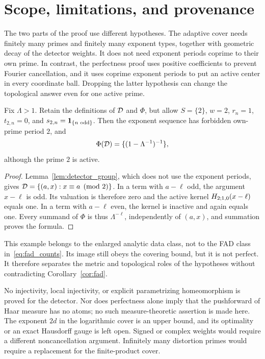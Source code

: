 \section{Scope, limitations, and provenance}\label{sec:scope}

The two parts of the proof use different hypotheses. The adaptive cover
needs finitely many primes and finitely many exponent types, together
with geometric decay of the detector weights. It does not need exponent
periods coprime to their own prime. In contrast, the perfectness proof
uses positive coefficients to prevent Fourier cancellation, and it uses
coprime exponent periods to put an active center in every coordinate
ball. Dropping the latter hypothesis can change the topological answer
even for one active prime.

\begin{proposition}\label{prop:forbidden_period}
Fix $\Lambda>1$. Retain the definitions of $\mathcal D$ and $\Phi$, but allow
$S=\{2\}$, $w=2$, $r_n=1$, $t_{2,n}=0$, and
$s_{2,n}=\mathbf 1_{\{n\text{ odd}\}}$. Then the exponent sequence has forbidden
own-prime period $2$, and
\[
 \Phi(\mathcal D)=\{(1-\Lambda^{-1})^{-1}\},
\]
although the prime $2$ is active.
\end{proposition}

\begin{proof}
Lemma~\ref{lem:detector_group}, which does not use the exponent periods,
gives $\mathcal D=\{(a,x):x\equiv a\pmod2\}$. In a term with $a-\ell$ odd,
the argument $x-\ell$ is odd. Its valuation is therefore zero and the
active kernel $H_{2;1,0}(x-\ell)$ equals one. In a term with
$a-\ell$ even, the kernel is inactive and again equals one. Every
summand of $\Phi$ is thus $\Lambda^{-\ell}$, independently of $(a,x)$,
and summation proves the formula.
\end{proof}

This example belongs to the enlarged analytic data class, not to the FAD
class in~\eqref{eq:fad_counts}. Its image still obeys the covering bound,
but it is not perfect. It therefore separates the metric and topological
roles of the hypotheses without contradicting Corollary~\ref{cor:fad}.

No injectivity, local injectivity, or explicit parametrizing homeomorphism
is proved for the detector. Nor does perfectness alone imply that the
pushforward of Haar measure has no atoms; no such measure-theoretic
assertion is made here. The exponent $2d$ in the logarithmic cover is an
upper bound, and its optimality or an exact Hausdorff gauge is left open.
Signed or complex weights would require a different noncancellation
argument. Infinitely many distortion primes would require a replacement
for the finite-product cover.

